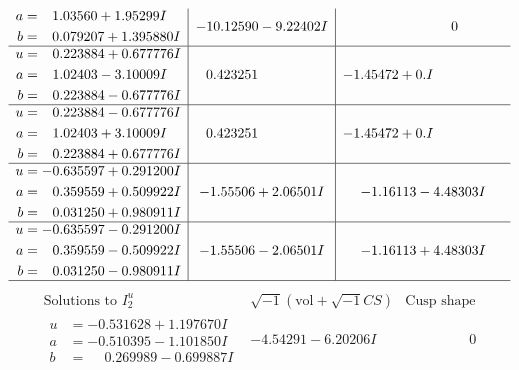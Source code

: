 \documentclass[1p]{elsarticle_modified}
\theoremstyle{definition}
\newcommand{\I}{\sqrt{-1}}
\begin{document}
$$\begin{array}{c|c|c}
\begin{aligned}
a &= \phantom{-}1.03560 + 1.95299 I \\
b &= \phantom{-}0.079207 + 1.395880 I\end{aligned}
 & -10.12590 - 9.22402 I & \phantom{-0.000000 } 0 \\ \hline\begin{aligned}
u &= \phantom{-}0.223884 + 0.677776 I \\
a &= \phantom{-}1.02403 - 3.10009 I \\
b &= \phantom{-}0.223884 - 0.677776 I\end{aligned}
 & \phantom{-}0.423251\phantom{ +0.000000I} & -1.45472 + 0. I\phantom{ +0.000000I} \\ \hline\begin{aligned}
u &= \phantom{-}0.223884 - 0.677776 I \\
a &= \phantom{-}1.02403 + 3.10009 I \\
b &= \phantom{-}0.223884 + 0.677776 I\end{aligned}
 & \phantom{-}0.423251\phantom{ +0.000000I} & -1.45472 + 0. I\phantom{ +0.000000I} \\ \hline\begin{aligned}
u &= -0.635597 + 0.291200 I \\
a &= \phantom{-}0.359559 + 0.509922 I \\
b &= \phantom{-}0.031250 + 0.980911 I\end{aligned}
 & -1.55506 + 2.06501 I & -1.16113 - 4.48303 I \\ \hline\begin{aligned}
u &= -0.635597 - 0.291200 I \\
a &= \phantom{-}0.359559 - 0.509922 I \\
b &= \phantom{-}0.031250 - 0.980911 I\end{aligned}
 & -1.55506 - 2.06501 I & -1.16113 + 4.48303 I\\
 \hline 
 \end{array}$$\newpage$$\begin{array}{c|c|c}  
\text{Solutions to }I^u_{2}& \I (\text{vol} + \sqrt{-1}CS) & \text{Cusp shape}\\
 \hline 
\begin{aligned}
u &= -0.531628 + 1.197670 I \\
a &= -0.510395 - 1.101850 I \\
b &= \phantom{-}0.269989 - 0.699887 I\end{aligned}
 & -4.54291 - 6.20206 I & \phantom{-0.000000 } 0 \\ \hline\begin{aligned}

\end{aligned}
\end{array}$$
\end{document}
